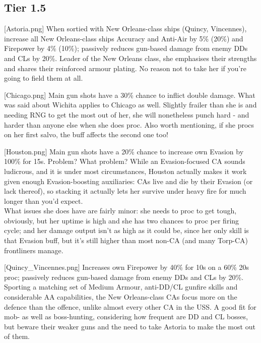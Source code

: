  
\newpage
\subsection{Tier 1.5}
[Astoria.png]
{When sortied with New Orleans-class ships (Quincy, Vincennes), increase all New Orleans-class ships Accuracy and Anti-Air by 5\% (20\%) and Firepower by 4\% (10\%); passively reduces gun-based damage from enemy DDs and CLs by 20\%. }
{}
{Leader of the New Orleans class, she emphasises their strengths and shares their reinforced armour plating. No reason not to take her if you're going to field them at all.}

[Chicago.png]
{Main gun shots have a 30\% chance to inflict double damage.}
{}
{What was said about Wichita applies to Chicago as well. Slightly frailer than she is and needing RNG to get the most out of her, she will nonetheless punch hard - and harder than anyone else when she does proc. Also worth mentioning, if she procs on her first salvo, the buff affects the second one too!}

[Houston.png]
{Main gun shots have a 20\% chance to increase own Evasion by 100\% for 15s.}
{Problem? What problem?}
{While an Evasion-focused CA sounds ludicrous, and it is under most circumstances, Houston actually makes it work given enough Evasion-boosting auxiliaries: CAs live and die by their Evasion (or lack thereof), so stacking it actually lets her survive under heavy fire for much longer than you'd expect. \\
What issues she does have are fairly minor: she needs to proc to get tough, obviously, but her uptime is high and she has two chances to proc per firing cycle; and her damage output isn't as high as it could be, since her only skill is that Evasion buff, but it's still higher than most non-CA (and many Torp-CA) frontliners manage.}

[Quincy_Vincennes.png]
{Increases own Firepower by 40\% for 10s on a 60\% 20s proc; passively reduces gun-based damage from enemy DDs and CLs by 20\%. }
{}
{Sporting a matching set of Medium Armour, anti-DD/CL gunfire skills and considerable AA capabilities, the New Orleans-class CAs focus more on the defence than the offence, unlike almost every other CA in the USS. A good fit for mob- as well as boss-hunting, considering how frequent are DD and CL bosses, but beware their weaker guns and the need to take Astoria to make the most out of them.}

